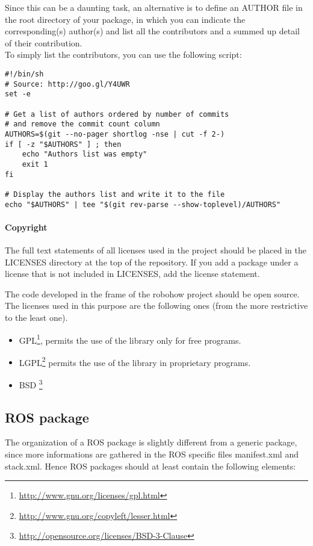 Since this can be a daunting task, an alternative is to define an AUTHOR file in the root directory of your package, in which you can indicate the corresponding(s) author(s) and list all the contributors and a summed up detail of their contribution.\\

To simply list the contributors, you can use the following script:
\begin{verbatim}
#!/bin/sh
# Source: http://goo.gl/Y4UWR
set -e

# Get a list of authors ordered by number of commits
# and remove the commit count column
AUTHORS=$(git --no-pager shortlog -nse | cut -f 2-)
if [ -z "$AUTHORS" ] ; then
    echo "Authors list was empty"
    exit 1
fi

# Display the authors list and write it to the file
echo "$AUTHORS" | tee "$(git rev-parse --show-toplevel)/AUTHORS"
\end{verbatim}

\paragraph{Copyright}
The full text statements of all licenses used in the project should be placed in the LICENSES directory at the top of the repository.
If you add a package under a license that is not included in LICENSES, add the license statement.

The code developed in the frame of the robohow project should be open source.
The licenses used in this purpose are the following ones (from the more restrictive to the least one).
\begin{itemize}[noitemsep,topsep=0pt,parsep=0pt,partopsep=0pt]
\item GPL\footnote{\url{http://www.gnu.org/licenses/gpl.html}}, permits the use of the library only for free programs.
\item LGPL\footnote{\url{http://www.gnu.org/copyleft/lesser.html}} permits the use of the library in proprietary programs.
\item BSD \footnote{\url{http://opensource.org/licenses/BSD-3-Clause}}
\end{itemize}

\subsection{ROS package}
The organization of a ROS package is slightly different from a generic package, since
more informations are gathered in the ROS specific files manifest.xml and stack.xml.
Hence ROS packages should at least contain the following elements:
